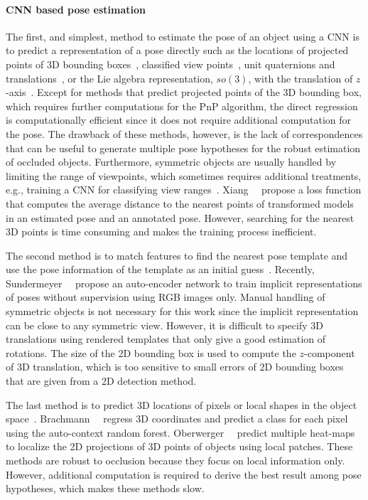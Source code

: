 \documentclass[10pt,twocolumn,letterpaper]{article}
\begin{document}
\paragraph{CNN based pose estimation} The first, and simplest, method to estimate the pose of an object using a CNN is to predict a representation of a pose directly such as the locations of projected points of 3D bounding boxes~\cite{rad2017bb8,Tekin_2018_CVPR}, classified view points~\cite{kehl2017ssd}, unit quaternions and translations~\cite{xiang2017posecnn}, or the Lie algebra representation, $so(3)$, with the translation of $z$-axis~\cite{Do2018LieNetRM}. Except for methods that predict projected points of the 3D bounding box, which requires further computations for the PnP algorithm, the direct regression is computationally efficient since it does not require additional computation for the pose. The drawback of these methods, however, is the lack of correspondences that can be useful to generate multiple pose hypotheses for the robust estimation of occluded objects. Furthermore, symmetric objects are usually handled by limiting the range of viewpoints, which sometimes requires additional treatments, e.g., training a CNN for classifying view ranges~\cite{rad2017bb8}. Xiang~\etal~\cite{xiang2017posecnn} propose a loss function that computes the average distance to the nearest points of transformed models in an estimated pose and an annotated pose. However, searching for the nearest 3D points is time consuming and makes the training process inefficient. 


The second method is to match features to find the nearest pose template and use the pose information of the template as an initial guess~\cite{linemode_hinterstoisser2012}. Recently, Sundermeyer~\etal~\cite{Sundermeyer_2018_ECCV_implicit} propose an auto-encoder network to train implicit representations of poses without supervision using RGB images only. Manual handling of symmetric objects is not necessary for this work since the implicit representation can be close to any symmetric view. However, it is difficult to specify 3D translations using rendered templates that only give a good estimation of rotations. The size of the 2D bounding box is used to compute the $z$-component of 3D translation, which is too sensitive to small errors of 2D bounding boxes that are given from a 2D detection method.

The last method is to predict 3D locations of pixels or local shapes in the object space~\cite{cnn_pose:brachmann2016uncertainty_only_rgb,kehl2016deep,Oberweger_2018_ECCV_heatmap}. Brachmann~\etal~\cite{cnn_pose:brachmann2016uncertainty_only_rgb} regress 3D coordinates and predict a class for each pixel using the auto-context random forest. Oberwerger~\etal~\cite{Oberweger_2018_ECCV_heatmap} predict multiple heat-maps to localize the 2D projections of 3D points of objects using local patches. These methods are robust to occlusion because they focus on local information only. However, additional computation is required to derive the best result among pose hypotheses, which makes these methods slow. 
\end{document}
